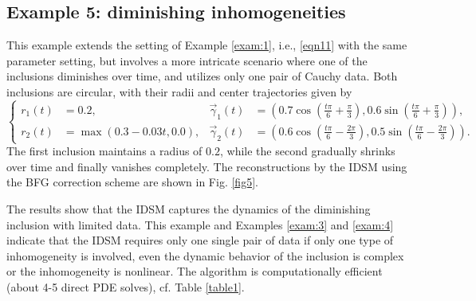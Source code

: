 \documentclass[onefignum,onetabnum]{siamart190516}
\numberwithin{equation}{section}
\begin{document}
\subsection{Example 5: diminishing inhomogeneities}\label{exam:5}
This example extends the setting of Example \ref{exam:1}, i.e., \eqref{eqn11} with the same parameter setting, but involves a more intricate scenario where one of the inclusions diminishes over time, and utilizes only one pair of Cauchy data.
Both inclusions are circular, with their radii and center trajectories given by
\begin{equation*}
\left\{
\begin{aligned}
r_{1}(t) &= 0.2,&
\vec{\gamma}_{1}(t) &= \left(0.7\cos\left(\tfrac{t\pi}{6} + \tfrac{\pi}{3}\right), 0.6\sin\left(\tfrac{t\pi}{6} + \tfrac{\pi}{3}\right)\right), \\
r_{2}(t) &= \max(0.3 - 0.03t, 0.0),&
\vec{\gamma}_{2}(t) &= \left(0.6\cos\left(\tfrac{t\pi}{6} - \tfrac{2\pi}{3}\right), 0.5\sin\left(\tfrac{t\pi}{6} - \tfrac{2\pi}{3}\right)\right).
\end{aligned}
\right.
\end{equation*}
The first inclusion maintains a radius of $0.2$, while the second gradually shrinks over time and finally vanishes completely.
The reconstructions by the IDSM using the BFG correction scheme are shown in Fig. \ref{fig5}.

The results show that the IDSM captures the dynamics of the diminishing inclusion with limited data.
This example and Examples \ref{exam:3} and \ref{exam:4} indicate that the IDSM requires only one single pair of data if only one type of inhomogeneity is involved, even the dynamic behavior of the inclusion is complex or the inhomogeneity is nonlinear.
The algorithm is computationally efficient (about 4-5 direct PDE solves), cf. Table \ref{table1}.
\end{document}

